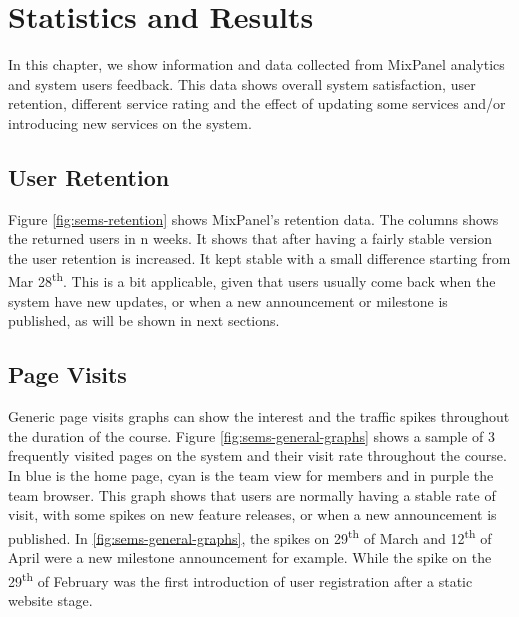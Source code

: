 \chapter{Statistics and Results}
\label{chap:statistics}

In this chapter, we show information and data collected from MixPanel\texttrademark{} analytics and system users feedback. This data shows
overall system satisfaction, user retention, different service rating and the effect of updating some services and/or introducing new services on the system.

\section{User Retention}
\label{sec:user-retention}

Figure \ref{fig:sems-retention} shows MixPanel\texttrademark{}'s retention data. The columns shows the returned users in n weeks.
It shows that after having a fairly stable version the user retention is increased. It kept stable with a small difference starting
from Mar 28\textsuperscript{th}. This is a bit applicable, given that users usually come back when the system have new updates, or when a
new announcement or milestone is published, as will be shown in next sections.

\section{Page Visits}
\label{sec:page-visits}
Generic page visits graphs can show the interest and the traffic spikes throughout the duration of the course. Figure \ref{fig:sems-general-graphs}
shows a sample of 3 frequently visited pages on the system and their visit rate throughout the course. In blue is the home page,
cyan is the team view for members and in purple the team browser. This graph shows that users are normally having a stable rate of visit, with some
spikes on new feature releases, or when a new announcement is published. In \ref{fig:sems-general-graphs}, the spikes on 29\textsuperscript{th} of March and
12\textsuperscript{th} of April were a new milestone announcement for example. While the spike on the 29\textsuperscript{th} of February was the first
introduction of user registration after a static website stage.

